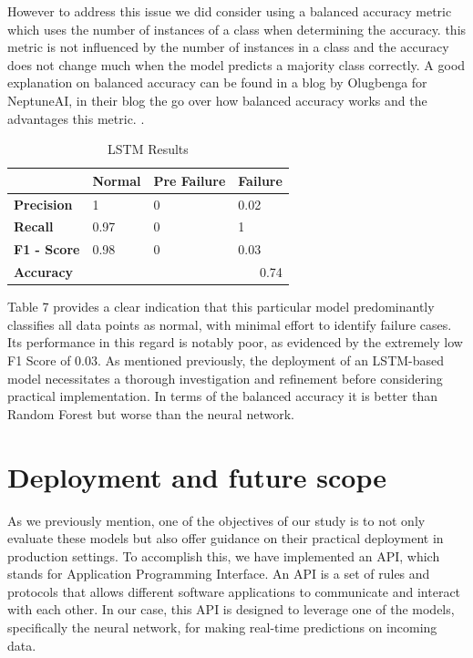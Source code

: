 \documentclass{article}
\begin{document}
However to address this issue we did consider using a balanced accuracy metric which uses the number of instances of a class when determining the accuracy. this metric is not influenced by the number of instances in a class and the accuracy does not change much when the model predicts a majority class correctly. A good explanation on balanced accuracy can be found in a blog by Olugbenga for NeptuneAI, in their blog the go over how balanced accuracy works and the advantages this metric. \cite{Olugbenga2023}.\\

\begin{table}[htbp]
\caption{LSTM Results}
\centering
\begin{tabular}{|l|lll|}
\hline
                    & \multicolumn{1}{l|}{\textbf{Normal}} & \multicolumn{1}{l|}{\textbf{Pre Failure}} & \textbf{Failure} \\ \hline
\textbf{Precision}  & \multicolumn{1}{l|}{1}               & \multicolumn{1}{l|}{0}                    & 0.02             \\ \hline
\textbf{Recall}     & \multicolumn{1}{l|}{0.97}            & \multicolumn{1}{l|}{0}                    & 1                \\ \hline
\textbf{F1 - Score} & \multicolumn{1}{l|}{0.98}            & \multicolumn{1}{l|}{0}                    & 0.03             \\ \hline
\textbf{Accuracy}   & \multicolumn{3}{r|}{0.74}                                                                           \\ \hline
\end{tabular}
\end{table}

Table 7 provides a clear indication that this particular model predominantly classifies all data points as normal, with minimal effort to identify failure cases. Its performance in this regard is notably poor, as evidenced by the extremely low F1 Score of 0.03. As mentioned previously, the deployment of an LSTM-based model necessitates a thorough investigation and refinement before considering practical implementation. In terms of the balanced accuracy it is better than Random Forest but worse than the neural network.


\section{Deployment and future scope}
As we previously mention, one of the objectives of our study is to not only evaluate these models but also offer guidance on their practical deployment in production settings. To accomplish this, we have implemented an API, which stands for Application Programming Interface. An API is a set of rules and protocols that allows different software applications to communicate and interact with each other. In our case, this API is designed to leverage one of the models, specifically the neural network, for making real-time predictions on incoming data.\\
\end{document}
